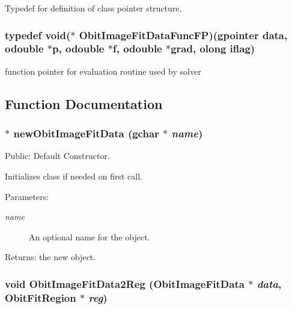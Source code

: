Typedef for definition of class pointer structure. 

\subsubsection{\setlength{\rightskip}{0pt plus 5cm}typedef void($\ast$ {\bf Obit\-Image\-Fit\-Data\-Func\-FP})(gpointer data, {\bf odouble} $\ast$p, {\bf odouble} $\ast$f, {\bf odouble} $\ast$grad, {\bf olong} iflag)}\label{ObitImageFitData_8h_a3}


function pointer for evaluation routine used by solver 



\subsection{Function Documentation}
\subsubsection{$\ast$ new\-Obit\-Image\-Fit\-Data (gchar $\ast$ {\em name})}\label{ObitImageFitData_8h_a7}


Public: Default Constructor. 

Initializes class if needed on first call. \begin{Desc}
\item[Parameters:]
\begin{description}
\item[{\em name}]An optional name for the object. \end{description}
\end{Desc}
\begin{Desc}
\item[Returns:]the new object. \end{Desc}
\subsubsection{\setlength{\rightskip}{0pt plus 5cm}void Obit\-Image\-Fit\-Data2Reg ({\bf Obit\-Image\-Fit\-Data} $\ast$ {\em data}, {\bf Obit\-Fit\-Region} $\ast$ {\em reg})}\label{ObitImageFitData_8h_a9}


